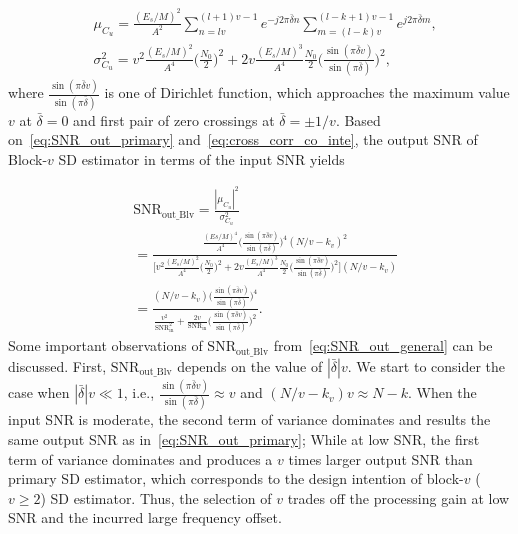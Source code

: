 \begin{equation}
  \begin{aligned}
  \label{eq:cross_corr_co_inte}
  &\mu_{C_u}=\frac{(E_s/M)^2}{A^2}\sum_{n=lv}^{(l+1)v-1}e^{-j2\pi \bar{\delta}n}\sum_{m=(l-k)v}^{(l-k+1)v-1}e^{j2\pi \bar{\delta}m}, \\
  &\sigma^2_{C_u}=v^2\frac{(E_s/M)^2}{A^4}\Big(\frac{N_0}{2}\Big)^2+2v\frac{(E_s/M)^3}{A^4}\frac{N_0}{2}\Bigg(\frac{\sin(\pi \bar{\delta}v)}{\sin(\pi \bar{\delta})}\Bigg)^2,
\end{aligned}
\end{equation}
where $\frac{\sin(\pi \bar{\delta}v)}{\sin(\pi \bar{\delta})}$ is one of Dirichlet function, which approaches the maximum value $v$ at $\bar{\delta}=0$ and first pair of zero crossings at
$\bar{\delta}=\pm 1/v$. Based on~\eqref{eq:SNR_out_primary} and~\eqref{eq:cross_corr_co_inte}, 
the output SNR of Block-$v$ SD estimator in terms of the input SNR yields

\begin{equation}
  \begin{aligned}
    \label{eq:SNR_out_general}
    &\text{SNR}_{\text{out\_Blv}}=\frac{|\mu_{C_u}|^2}{\sigma^2_{C_u}} \\
    &=\frac{\frac{(Es/M)^4}{A^4}\Big(\frac{\sin(\pi \bar{\delta}v)}{\sin(\pi \bar{\delta})}\Big)^4(N/v-k_v)^2}
    {\Big[v^2\frac{(E_s/M)^2}{A^4}\Big(\frac{N_0}{2}\Big)^2+2v\frac{(E_s/M)^3}{A^4}\frac{N_0}{2}\Big(\frac{\sin(\pi \bar{\delta}v)}{\sin(\pi \bar{\delta})}\Big)^2\Big](N/v-k_v)} \\
    &=\frac{(N/v-k_v)\Big(\frac{\sin(\pi \bar{\delta}v)}{\sin(\pi \bar{\delta})}\Big)^4}
    {\frac{v^2}{\text{SNR}_{\text{in}}^2}+\frac{2v}{\text{SNR}_{\text{in}}}\Big(\frac{\sin(\pi \bar{\delta}v)}{\sin(\pi \bar{\delta})}\Big)^2}.
  \end{aligned}
\end{equation}
Some important observations of $\text{SNR}_{\text{out\_Blv}}$ from~\eqref{eq:SNR_out_general} can be discussed. 
First, $\text{SNR}_{\text{out\_Blv}}$ depends on the value of $|\bar{\delta}|v$.
We start to consider the case when $|\bar{\delta}|v\ll1$, i.e., $\frac{\sin(\pi \bar{\delta}v)}{\sin(\pi \bar{\delta})} \approx v$
and $(N/v-k_v)v \approx N-k$.
When the input SNR is moderate, the second term of variance dominates and results the same output SNR as in~\eqref{eq:SNR_out_primary};
While at low SNR, the first term of variance dominates and produces a $v$ times larger output SNR than primary SD estimator, which corresponds to the design intention of block-$v$ ($v \geq 2$) SD estimator.
Thus, the selection of $v$ trades off the processing gain at low SNR and the incurred large frequency offset.

